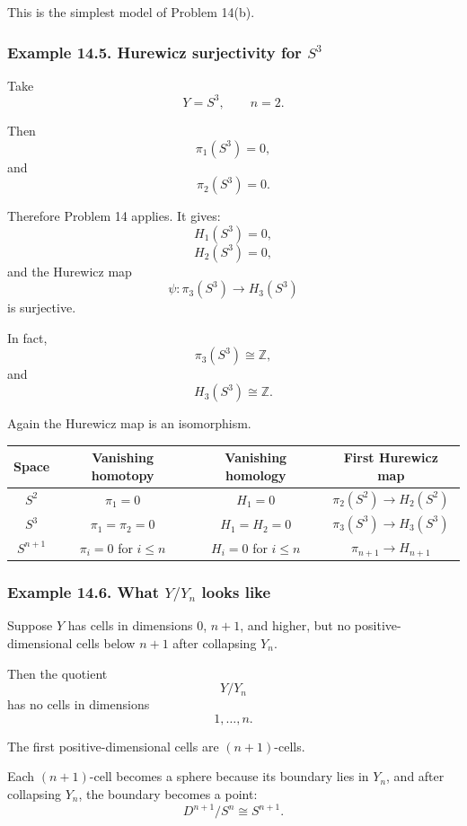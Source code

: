 \documentclass[12pt,a4paper]{article}
\theoremstyle{notespace}
\begin{document}
This is the simplest model of Problem 14(b).

\subsubsection*{Example 14.5. Hurewicz surjectivity for \(S^3\)}

Take
\[
Y=S^3,
\qquad
n=2.
\]

Then
\[
\pi_1(S^3)=0,
\]
and
\[
\pi_2(S^3)=0.
\]

Therefore Problem 14 applies. It gives:
\[
H_1(S^3)=0,
\]
\[
H_2(S^3)=0,
\]
and the Hurewicz map
\[
\psi:\pi_3(S^3)\to H_3(S^3)
\]
is surjective.

In fact,
\[
\pi_3(S^3)\cong \mathbb Z,
\]
and
\[
H_3(S^3)\cong \mathbb Z.
\]

Again the Hurewicz map is an isomorphism.

\begin{center}
	\renewcommand{\arraystretch}{1.25}
	\begin{tabular}{c|c|c|c}
		\textbf{Space} & \textbf{Vanishing homotopy} & \textbf{Vanishing homology} & \textbf{First Hurewicz map}\\
		\hline
		\(S^2\) & \(\pi_1=0\) & \(H_1=0\) & \(\pi_2(S^2)\to H_2(S^2)\)\\
		\(S^3\) & \(\pi_1=\pi_2=0\) & \(H_1=H_2=0\) & \(\pi_3(S^3)\to H_3(S^3)\)\\
		\(S^{n+1}\) & \(\pi_i=0\) for \(i\leq n\) & \(H_i=0\) for \(i\leq n\) & \(\pi_{n+1}\to H_{n+1}\)
	\end{tabular}
\end{center}

\subsubsection*{Example 14.6. What \(Y/Y_n\) looks like}

Suppose \(Y\) has cells in dimensions \(0\), \(n+1\), and higher, but no positive-dimensional cells below \(n+1\) after collapsing \(Y_n\).

Then the quotient
\[
Y/Y_n
\]
has no cells in dimensions
\[
1,\dots,n.
\]

The first positive-dimensional cells are \((n+1)\)-cells.

Each \((n+1)\)-cell becomes a sphere because its boundary lies in \(Y_n\), and after collapsing \(Y_n\), the boundary becomes a point:
\[
D^{n+1}/S^n\cong S^{n+1}.
\]
\end{document}
